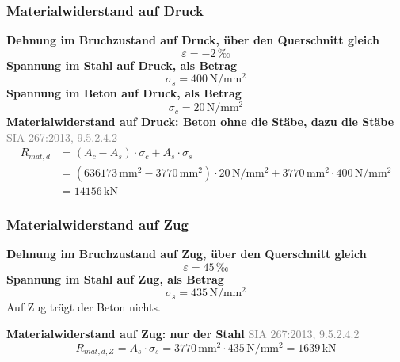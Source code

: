 \documentclass[11pt,a4paper]{article}
\newcommand{\normref}[1]{{\small\textcolor{gray}{#1}}}
\begin{document}
\subsubsection{Materialwiderstand auf Druck}
\noindent\textbf{Dehnung im Bruchzustand auf Druck, über den Querschnitt gleich}
\begin{equation*}
\varepsilon = -2\,\text{‰}
\end{equation*}
\noindent\textbf{Spannung im Stahl auf Druck, als Betrag}
\begin{equation*}
\sigma_s = 400\,\mathrm{N}/\mathrm{mm}^{2}
\end{equation*}
\noindent\textbf{Spannung im Beton auf Druck, als Betrag}
\begin{equation*}
\sigma_c = 20\,\mathrm{N}/\mathrm{mm}^{2}
\end{equation*}
\noindent\textbf{Materialwiderstand auf Druck: Beton ohne die Stäbe, dazu die Stäbe} \hfill \normref{SIA 267:2013, 9.5.2.4.2}
\begin{equation*}
\begin{aligned}
  R_{mat,d} &= \left(A_c - A_s\right) \cdot \sigma_c + A_s \cdot \sigma_s \\
  &= \left(636173\,\mathrm{mm}^{2} - 3770\,\mathrm{mm}^{2}\right) \cdot 20\,\mathrm{N}/\mathrm{mm}^{2} + 3770\,\mathrm{mm}^{2} \cdot 400\,\mathrm{N}/\mathrm{mm}^{2} \\
  &= 14156\,\mathrm{kN}
\end{aligned}
\end{equation*}
\subsubsection{Materialwiderstand auf Zug}
\noindent\textbf{Dehnung im Bruchzustand auf Zug, über den Querschnitt gleich}
\begin{equation*}
\varepsilon = 45\,\text{‰}
\end{equation*}
\noindent\textbf{Spannung im Stahl auf Zug, als Betrag}
\begin{equation*}
\sigma_s = 435\,\mathrm{N}/\mathrm{mm}^{2}
\end{equation*}
Auf Zug trägt der Beton nichts.

\noindent\textbf{Materialwiderstand auf Zug: nur der Stahl} \hfill \normref{SIA 267:2013, 9.5.2.4.2}
\begin{equation*}
R_{mat,d,Z} = A_s \cdot \sigma_s = 3770\,\mathrm{mm}^{2} \cdot 435\,\mathrm{N}/\mathrm{mm}^{2} = 1639\,\mathrm{kN}
\end{equation*}
\end{document}
